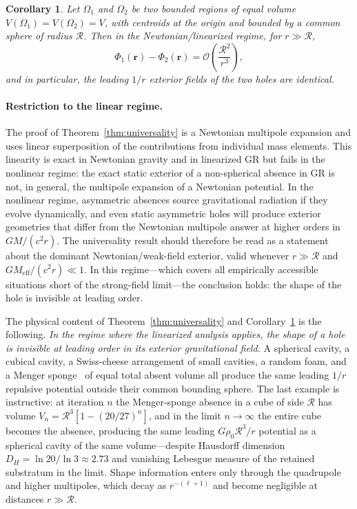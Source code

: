 \documentclass[%
  reprint,
  superscriptaddress,
  showpacs,
  showkeys,
  amsmath,amssymb,
  pra,
  longbibliography,
  floatfix,
  x11names
]{revtex4-2}
\newtheorem{corollary}[theorem]{Corollary}
\begin{document}
\begin{corollary}
\label{cor:universality}
Let $\Omega_1$ and $\Omega_2$ be two bounded regions of equal volume $V(\Omega_1) = V(\Omega_2) = V$, with centroids at the origin and bounded by a common sphere of radius $\mathcal{R}$. Then in the Newtonian/linearized regime, for $r \gg \mathcal{R}$,
\begin{equation}
\Phi_1(\mathbf{r}) - \Phi_2(\mathbf{r}) = \mathcal{O}\!\left(\frac{\mathcal{R}^2}{r^3}\right),
\end{equation}
and in particular, the leading $1/r$ exterior fields of the two holes are identical.
\end{corollary}

\paragraph{Restriction to the linear regime.}
The proof of Theorem~\ref{thm:universality} is a Newtonian multipole expansion and uses linear superposition of the contributions from individual mass elements. This linearity is exact in Newtonian gravity and in linearized GR but fails in the nonlinear regime: the exact static exterior of a non-spherical absence in GR is not, in general, the multipole expansion of a Newtonian potential. In the nonlinear regime, asymmetric absences source gravitational radiation if they evolve dynamically, and even static asymmetric holes will produce exterior geometries that differ from the Newtonian multipole answer at higher orders in $GM/(c^2 r)$. The universality result should therefore be read as a statement about the dominant Newtonian/weak-field exterior, valid whenever $r \gg \mathcal{R}$ and $GM_{\mathrm{eff}}/(c^2 r) \ll 1$. In this regime---which covers all empirically accessible situations short of the strong-field limit---the conclusion holds: the shape of the hole is invisible at leading order.

The physical content of Theorem~\ref{thm:universality} and Corollary~\ref{cor:universality} is the following. \emph{In the regime where the linearized analysis applies, the shape of a hole is invisible at leading order in its exterior gravitational field.} A spherical cavity, a cubical cavity, a Swiss-cheese arrangement of small cavities, a random foam, and a Menger sponge~\cite{Menger1926a_reprint,Edgar_ClassicsOnFractals} of equal total absent volume all produce the same leading $1/r$ repulsive potential outside their common bounding sphere. The last example is instructive: at iteration $n$ the Menger-sponge absence in a cube of side $\mathcal{R}$ has volume $V_n = \mathcal{R}^3[1-(20/27)^n]$, and in the limit $n\to\infty$ the entire cube becomes the absence, producing the same leading $G\rho_0\mathcal{R}^3/r$ potential as a spherical cavity of the same volume---despite Hausdorff dimension $D_H = \ln 20/\ln 3 \approx 2.73$ and vanishing Lebesgue measure of the retained substratum in the limit. Shape information enters only through the quadrupole and higher multipoles, which decay as $r^{-(\ell+1)}$ and become negligible at distances $r \gg \mathcal{R}$.
\end{document}
